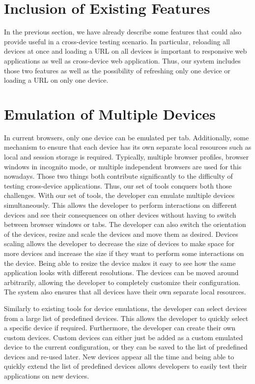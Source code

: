 \section{Inclusion of Existing Features}

In the previous section, we have already describe some features that could also provide useful in a cross-device testing scenario. In particular, reloading all devices at once and loading a URL on all devices is important to responsive web applications as well as cross-device web application. Thus, our system includes those two features as well as the possibility of refreshing only one device or loading a URL on only one device.

\section{Emulation of Multiple Devices}

In current browsers, only one device can be emulated per tab. Additionally, some mechanism to ensure that each device has its own separate local resources such as local and session storage is required. Typically, multiple browser profiles, browser windows in incognito mode, or multiple independent browsers are used for this nowadays. Those two things both contribute significantly to the difficulty of testing cross-device applications. Thus, our set of tools conquers both those challenges. With our set of tools, the developer can emulate multiple devices simultaneously. This allows the developer to perform interactions on different devices and see their consequences on other devices without having to switch between browser windows or tabs. The developer can also switch the orientation of the devices, resize and scale the devices and move them as desired. Devices scaling allows the developer to decrease the size of devices to make space for more devices and increase the size if they want to perform some interactions on the device. Being able to resize the device makes it easy to see how the same application looks with different resolutions. The devices can be moved around arbitrarily, allowing the developer to completely customize their configuration. The system also ensures that all devices have their own separate local resources.

Similarly to existing tools for device emulations, the developer can select devices from a large list of predefined devices. This allows the developer to quickly select a specific device if required. Furthermore, the developer can create their own custom devices. Custom devices can either just be added as a custom emulated device to the current configuration, or they can be saved to the list of predefined devices and re-used later. New devices appear all the time and being able to quickly extend the list of predefined devices allows developers to easily test their applications on new devices.

